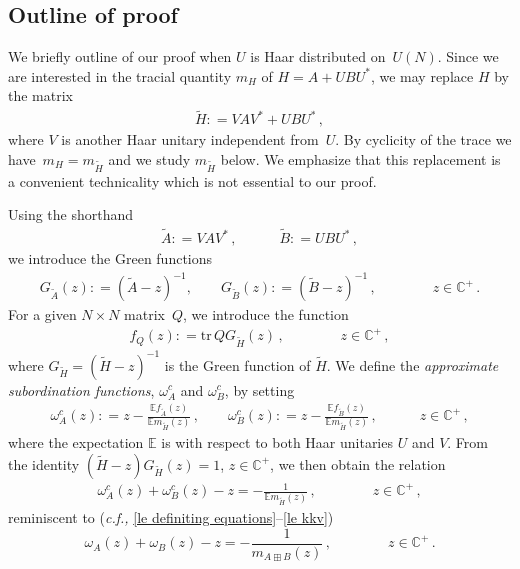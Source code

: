 \documentclass[10pt,reqno]{amsart}
\numberwithin{equation}{section}
\theoremstyle{plain}
\numberwithin{kevin}{section}
\theoremstyle{remark}
\newcommand{\E}{{\mathbb E }}
\newcommand{\C}{{\mathbb C}}
\newcommand{\deq}{\mathrel{\mathop:}=}
\newcommand{\ntr}{\mathrm{tr}\,}
\newcommand{\cf}{\emph{c.f., }}
\begin{document}
\subsection{Outline of proof} \label{s.2.4}
We briefly outline of our proof when $U$ is Haar distributed on~$U(N)$. Since we are interested in the tracial quantity $m_H$ of $H=A+UBU^*$, we may replace $H$ by the matrix
\begin{align}
 \widetilde H\deq VAV^*+UBU^*\,,
\end{align}
where $V$ is another Haar unitary independent from~$U$. By cyclicity of the trace we have~$m_H=m_{\widetilde H}$ and we study $m_{\widetilde H}$ below. We emphasize that this replacement is a convenient technicality which is not essential to our proof.

Using the shorthand
\begin{align}
\widetilde{A}\deq VAV^*\,,\quad\qquad \widetilde{B}\deq UBU^* \,,\label{071905}
\end{align}
we introduce the Green functions 
\begin{eqnarray}\label{le greens functions}
G_{\widetilde{A}}(z)\deq(\widetilde{A}-z)^{-1},\qquad G_{\widetilde{B}}(z)\deq(\widetilde{B}-z)^{-1}\,,\qquad\qquad z\in\C^+\,.
\end{eqnarray}
For a given $N\times N$ matrix~$Q$, we introduce the function
\begin{align}\label{le ff}
f_Q(z)\deq\ntr QG_{\widetilde H}(z)\,,\qquad\qquad z\in\C^+\,,
\end{align}
where $G_{\widetilde H}=(\widetilde H-z)^{-1}$ is the Green function of ${\widetilde H}$. We define  the {\it approximate subordination functions}, $\omega_A^c$ and $\omega_B^c$, by setting
\begin{align}\label{060104}
\omega_A^c(z)\deq z-\frac{\mathbb{E} f_{\widetilde{A}}(z)}{\mathbb{E} m_{\widetilde H}(z)}\,,\qquad \omega_B^c(z)\deq z-\frac{\mathbb{E} f_{\widetilde{B}}(z)}{\mathbb{E} m_{\widetilde H}(z)}\,,\quad\qquad 
 z\in\C^+\,,
\end{align}
where the expectation $\mathbb{E}$ is with respect to both Haar unitaries $U$ and $V$. From
the identity $({\widetilde H}-z)G_{\widetilde H}(z)=1$, $z\in\C^+$, we then obtain the relation
\begin{align}\label{le third equation}	
\omega_A^c(z)+\omega_B^c(z)-z=-\frac{1}{\E m_{\widetilde H}(z)}\,,\qquad\qquad z\in\C^+\,,
\end{align}
reminiscent to  (\cf \eqref{le definiting equations}--\eqref{le kkv})
$$
    \omega_A (z)+\omega_B (z)-z=-\frac{1}{ m_{A\boxplus B}(z)}\,,\qquad\qquad z\in\C^+\,.
$$
\end{document}
